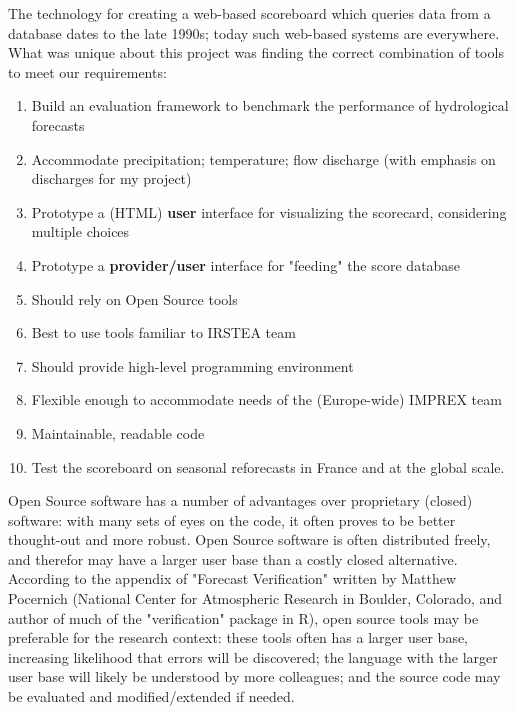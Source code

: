 \documentclass[logos,parttoc,morelanguage=french,morelanguage=german,draft]{orsay-memoire}
\begin{document}
The technology for creating a web-based scoreboard which queries data from a database dates to the late 1990s; today such web-based systems are everywhere. What was unique about this project was finding the correct combination of tools to meet our requirements:
\begin{enumerate}
	\item Build an evaluation framework to benchmark the performance of hydrological forecasts
    \item Accommodate precipitation; temperature; flow discharge (with emphasis on discharges for my project)
    \item Prototype a (HTML) \textbf{user} interface for visualizing the scorecard, considering multiple choices
   	\item Prototype a \textbf{provider/user} interface for "feeding" the score database
	\item Should rely on Open Source tools
    \item Best to use tools familiar to IRSTEA team
    \item Should provide high-level programming environment
    \item Flexible enough to accommodate needs of the  (Europe-wide) IMPREX team
    \item Maintainable, readable code
    \item Test the scoreboard on seasonal reforecasts in France and at the global scale.
\end{enumerate}

Open Source software has a number of advantages over proprietary (closed) software: with many sets of eyes on the code, it often proves to be better thought-out and more robust. Open Source software is often distributed freely, and therefor may have a larger user base than a costly closed alternative. According to the appendix of "Forecast Verification" \autocite{JolliffeIanT.andStephenson2012ForecastVerification} written by Matthew Pocernich (National Center for Atmospheric Research in Boulder, Colorado, and author of much of the "verification" package in R), open source tools may be preferable for the research context: these tools often has a larger user base, increasing likelihood that errors will be discovered; the language with the larger user base  will likely be understood by more colleagues; and the source code may be evaluated and modified/extended if needed.
%
%
\end{document}
